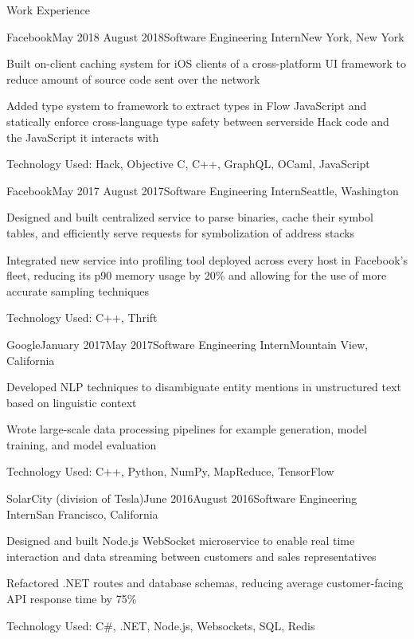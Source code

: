 \documentclass{resume} %
\begin{document}
\begin{rSection}{Work Experience}
\begin{rSubsection}{Facebook}{May 2018 \textminus August 2018}{Software Engineering Intern}{New York, New York}
\item[] Built on-client caching system for iOS clients of a cross-platform UI framework to reduce amount of source code sent over the network
\item[] Added type system to framework to extract types in Flow JavaScript and statically enforce cross-language type safety between serverside Hack code and the JavaScript it interacts with
\item[] Technology Used: Hack, Objective C, C++, GraphQL, OCaml, JavaScript
\end{rSubsection}
\begin{rSubsection}{Facebook}{May 2017 \textminus August 2017}{Software Engineering Intern}{Seattle, Washington}
\item[] Designed and built centralized service to parse binaries, cache their symbol tables, and efficiently serve requests for symbolization of address stacks
\item[] Integrated new service into profiling tool deployed across every host in Facebook's fleet, reducing its p90 memory usage by 20\% and allowing for the use of more accurate sampling techniques
\item[] Technology Used: C++, Thrift
\end{rSubsection}
\begin{rSubsection}{Google}{January 2017\textminus May 2017}{Software Engineering Intern}{Mountain View, California}
\item[] Developed NLP techniques to disambiguate entity mentions in unstructured text based on linguistic context
\item[] Wrote large-scale data processing pipelines for example generation, model training, and model evaluation
\item[] Technology Used: C++, Python, NumPy, MapReduce, TensorFlow
\end{rSubsection}
\begin{rSubsection}{SolarCity (division of Tesla)}{June 2016\textminus August 2016}{Software Engineering Intern}{San Francisco, California}
\item[] Designed and built Node.js WebSocket microservice to enable real time interaction and data streaming between customers and sales representatives
\item[] Refactored .NET routes and database schemas, reducing average customer-facing API response time by 75\%
\item[] Technology Used: C\#, .NET, Node.js, Websockets, SQL, Redis
\end{rSubsection}
\end{rSection}
\end{document}
